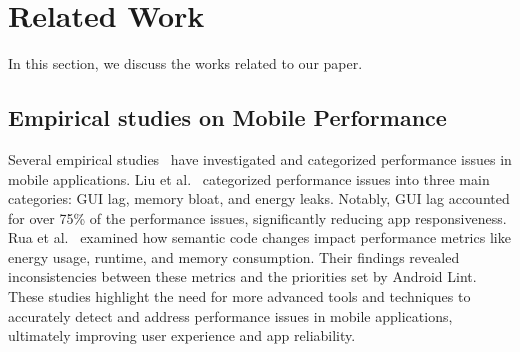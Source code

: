 \section{Related Work}
\label{sec:related}

In this section, we discuss the works related to our paper.

\subsection{Empirical studies on Mobile Performance}

Several empirical studies~\cite{ 2014_ICSE_Characterizing_and_detecting_performance_bugs, 2023_empirical_study_on_mobile_performance, 2020_EMSE_statically_detectable_performance_issues} have investigated and categorized performance issues in mobile applications.
Liu et al.~\cite{2014_ICSE_Characterizing_and_detecting_performance_bugs} categorized performance issues into three main categories: GUI lag, memory bloat, and energy leaks. Notably, GUI lag accounted for over 75\% of the performance issues, significantly reducing app responsiveness.
Rua et al.~\cite{2023_empirical_study_on_mobile_performance} examined how semantic code changes impact performance metrics like energy usage, runtime, and memory consumption. Their findings revealed inconsistencies between these metrics and the priorities set by Android Lint. 
These studies highlight the need for more advanced tools and techniques to accurately detect and address performance issues in mobile applications, ultimately improving user experience and app reliability.

